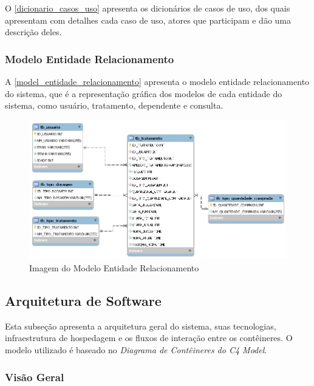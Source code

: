 \documentclass[
	article,			%
	12pt,				%
	oneside,			%
	a4paper,			%
    BIBLATEX,           %
	english,			%
	brazil,				%
	sumario=tradicional
	]{abntex2}
\begin{document}
O \autoref{dicionario_casos_uso} apresenta os dicionários de casos de uso, dos quais apresentam com detalhes cada caso de uso, atores que participam e dão uma descrição deles.

\newpage

\subsubsection{Modelo Entidade Relacionamento}

A \autoref{model_entidade_relacionamento} apresenta o modelo entidade relacionamento do sistema, que é a representação gráfica dos modelos de cada entidade do sistema, como usuário, tratamento, dependente e consulta.

\begin{figure}[!htbp]
    \centering
    \includegraphics[width=1.0\linewidth]{Figuras/bancoDados.jpg}
    \caption{Imagem do Modelo Entidade Relacionamento}
    \label{model_entidade_relacionamento}
\end{figure}

\newpage

\subsection{Arquitetura de Software}

Esta subseção apresenta a arquitetura geral do sistema, suas tecnologias, infraestrutura de hospedagem e os fluxos de interação entre os contêineres. O modelo utilizado é baseado no \textit{Diagrama de Contêineres do C4 Model}.

\subsubsection{Visão Geral}
\end{document}
